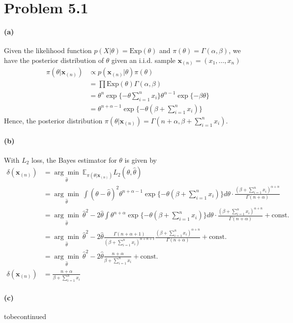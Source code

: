 \section{Problem 5.1}

\paragraph{(a)}
Given the likelihood function $p(X \vert \theta) = \mathrm{Exp}(\theta)$ and $\pi(\theta) = \Gamma(\alpha, \beta)$, we have the posterior distribution of $\theta$ given an i.i.d. sample $\bm{x}_{(n)} = (x_1, \dots, x_n)$
\begin{align*}
    \pi(\theta \vert \bm{x}_{(n)}) &\propto p(\bm{x}_{(n)} \vert \theta) \pi(\theta) \\
    &= \prod \mathrm{Exp}(\theta) \Gamma(\alpha, \beta)\\
    &= \theta^n \exp \{-\theta \sum_{i=1}^{n} x_i\} \theta^{\alpha-1} \exp \{ -\beta \theta\}\\
    &= \theta^{n+\alpha-1} \exp\{-\theta (\beta + \sum_{i=1}^{n} x_i)\}
\end{align*}
Hence, the posterior distribution $\pi(\theta \vert \bm{x}_{(n)}) = \Gamma(n+\alpha, \beta + \sum_{i=1}^{n}x_i)$.

\paragraph{(b)}
With $L_2$ loss, the Bayes estimator for $\theta$ is given by
\begin{align*}
    \delta(\bm{x}_{(n)})
    &= \underset{\hat{\theta}}{\arg\min}\ \mathbb{E}_{\pi(\theta \vert \bm{x}_{(n)})} L_2(\theta, \hat{\theta})\\
    &= \underset{\hat{\theta}}{\arg\min}\ \int (\theta - \hat{\theta})^2 \theta^{n+\alpha-1} \exp\{-\theta (\beta + \sum_{i=1}^{n} x_i)\} d\theta \cdot \frac{(\beta+\sum_{i=1}^{n}x_i)^{\alpha+n}}{\Gamma(n+\alpha)}\\
    &= \underset{\hat{\theta}}{\arg\min}\ \hat{\theta}^2 - 2\hat{\theta} \int \theta^{n+\alpha} \exp\{-\theta (\beta + \sum_{i=1}^{n} x_i)\} d\theta \cdot \frac{(\beta+\sum_{i=1}^{n}x_i)^{\alpha+n}}{\Gamma(n+\alpha)} + \mathrm{const.}\\
    &= \underset{\hat{\theta}}{\arg\min}\ \hat{\theta}^2 - 2\hat{\theta} \frac{\Gamma(n+\alpha+1)}{(\beta+\sum_{i=1}^{n}x_i)^{\alpha+n+1}} \frac{(\beta+\sum_{i=1}^{n}x_i)^{\alpha+n}}{\Gamma(n+\alpha)} + \mathrm{const.}\\
    &= \underset{\hat{\theta}}{\arg\min}\ \hat{\theta}^2 - 2\hat{\theta} \frac{n+\alpha}{\beta + \sum_{i=1}^n x_i} + \mathrm{const.}\\
    \delta(\bm{x}_{(n)})
    &= \frac{n+\alpha}{\beta + \sum_{i=1}^n x_i}
\end{align*}

\paragraph{(c)}
{\color{red} tobecontinued}
